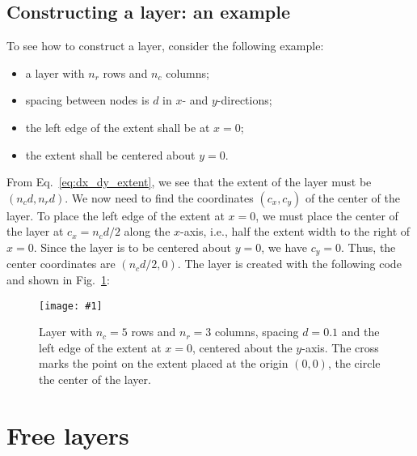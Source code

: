 \documentclass[a4paper,12pt]{report}
\newcommand{\scriptfig}[4]{%
\begin{figure}
\centerline{\texttt{[image: \#1]}}
\caption[#3]{#4}
\label{fig:#1}
\end{figure}%
}
\begin{document}
\subsection{Constructing a layer: an example}\label{sec:fixedlayerexample}

To see how to construct a layer, consider the following example:
\begin{itemize}
\item a layer with $n_r$ rows and $n_c$ columns;
\item spacing between nodes is $d$ in $x$- and $y$-directions;
\item the left edge of the extent shall be at $x=0$;
\item the extent shall be centered about $y=0$.
\end{itemize}
From Eq.~\ref{eq:dx_dy_extent}, we see that the extent of the layer
must be $(n_c d, n_r d)$. We now need to find the coordinates $(c_x,
c_y)$ of the center of the layer. To place the left edge of the extent
at $x=0$, we must place the center of the layer at $c_x=n_c d / 2$
along the $x$-axis, i.e., half the extent width to the right of
$x=0$. Since the layer is to be centered about $y=0$, we have
$c_y=0$. Thus, the center coordinates are $(n_c d/2, 0)$. The layer is
created with the following code and shown in Fig.~\ref{fig:layer3a}:
%

\scriptfig{layer3a}{0.5}{Layer construction example}%
{Layer with $n_c=5$ rows and $n_r=3$ columns, spacing $d=0.1$ and the
  left edge of the extent at $x=0$, centered about the $y$-axis. The
  cross marks the point on the extent placed at the origin $(0,0)$,
the circle the center of the layer.}
%


\section{Free layers}\label{sec:freelayer}
\end{document}
